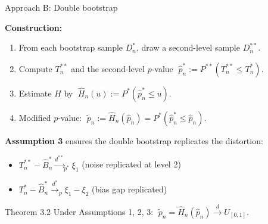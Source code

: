 \documentclass[10pt,aspectratio=169]{beamer}
\theoremstyle{plain}
\newcommand{\Pstar}{P^{*}}
\newcommand{\Pstst}{P^{**}}
\newcommand{\dto}{\xrightarrow{d}}
\newcommand{\dstarto}{\xrightarrow{d^{*}}}
\newcommand{\dstarstarto}{\xrightarrow{d^{**}}}
\newcommand{\Tns}{T_{n}^{*}}
\newcommand{\Tnss}{T_{n}^{**}}
\newcommand{\Bnhs}{\hat{B}_{n}^{*}}
\newcommand{\pnh}{\hat{p}_{n}}
\newcommand{\pnhs}{\hat{p}_{n}^{*}}
\newcommand{\pnt}{\tilde{p}_{n}}
\newcommand{\Hnh}{\hat{H}_{n}}
\newcommand{\Dns}{D_{n}^{*}}
\newcommand{\Dnss}{D_{n}^{**}}
\begin{document}
\begin{frame}{Approach B: Double bootstrap}

  \medskip

  \textbf{Construction:}
  \begin{enumerate}
    \setlength{\itemsep}{4pt}
    \item From each bootstrap sample $\Dns$, draw a second-level sample $\Dnss$.
    \item Compute $\Tnss$ and the second-level $p$-value
      $\;\pnhs := \Pstst(\Tnss \le \Tns)$.
    \item Estimate $H$ by $\;\Hnh(u) := \Pstar(\pnhs \le u)$.
    \item Modified $p$-value: $\;\pnt := \Hnh(\pnh) = \Pstar(\pnhs \le \pnh)$.
  \end{enumerate}

  \bigskip

  \textbf{Assumption 3} ensures the double bootstrap replicates the distortion:
  \begin{itemize}
    \item[(i)] $\Tnss - \Bnhs \dstarstarto_{p^*} \xi_1$ (noise replicated at level 2)
    \item[(ii)] $\Tns - \Bnhs \dstarto_p \xi_1 - \xi_2$ (bias gap replicated)
  \end{itemize}

  \medskip

  \begin{block}{Theorem 3.2}
    Under Assumptions 1, 2, 3: $\;\pnt = \Hnh(\pnh) \dto U_{[0,1]}$.
  \end{block}


\end{frame}

\end{document}
